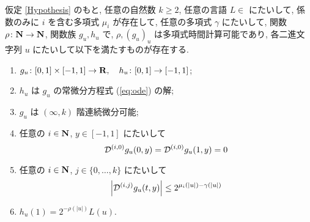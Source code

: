  \begin{lemma}
  \label{KTimesFamily}
  仮定 \ref{Hypothesis} のもと, 任意の自然数 $k \ge 2$,
  任意の言語 $L \in$ \PSPACE にたいして,
  係数のみに $i$ を含む多項式 $\mu_i$ が存在して,
  任意の多項式 $\gamma$ にたいして,
  関数 $\rho \colon \mathbf N \to \mathbf N$, 関数族 $g_u, h_u$ で,
  $\rho, (g_u)_u$ は多項式時間計算可能であり,
  各二進文字列 $u$ にたいして以下を満たすものが存在する.
  \begin{enumerate}
   \item $g_u\colon [0,1] \times [-1,1]\to \mathbf R, \quad h_u\colon [0,1] \to [-1,1]$;
   \item $h_u$ は $g_u$ の常微分方程式 (\ref{eq:ode}) の解;
   \item $g_u$ は $(\infty, k)$ 階連続微分可能;
   \item 任意の $i \in \mathbf N$, $y \in [-1,1]$ にたいして
	 \begin{equation*}
	  \mathcal D^{(i, 0)} g_u(0,y) = \mathcal D^{(i, 0)} g_u(1,y) = 0 
	 \end{equation*}
   \item 任意の $i \in \mathbf N$, $j \in \{0, \dots, k\}$ にたいして
	 \begin{equation*}
	  \left|\mathcal D^{(i,j)} g_u(t,y)\right| \le 2^{\mu_i(|u|) - \gamma(|u|)}
	 \end{equation*}
   \item $h_u(1) = 2^{-\rho(|u|)}L(u)$.
  \end{enumerate}
 \end{lemma}
 
